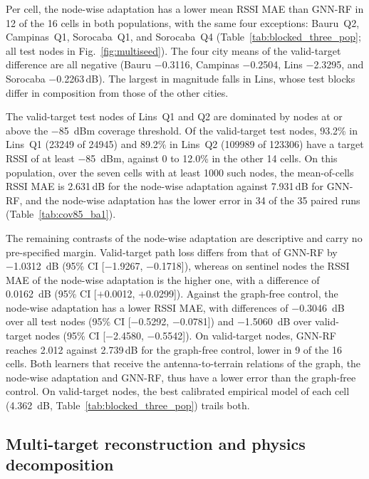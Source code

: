 \documentclass{ieeeaccess}
\begin{document}
Per cell, the node-wise adaptation has a lower mean RSSI MAE than GNN-RF in 12 of the 16 cells in both populations, with the same four exceptions: Bauru~Q2, Campinas~Q1, Sorocaba~Q1, and Sorocaba~Q4 (Table~\ref{tab:blocked_three_pop}; all test nodes in Fig.~\ref{fig:multiseed}). The four city means of the valid-target difference are all negative (Bauru $-$0.3116, Campinas $-$0.2504, Lins $-$2.3295, and Sorocaba $-$0.2263\,dB). The largest in magnitude falls in Lins, whose test blocks differ in composition from those of the other cities.

The valid-target test nodes of Lins~Q1 and Q2 are dominated by nodes at or above the $-$85~dBm coverage threshold. Of the valid-target test nodes, 93.2\% in Lins~Q1 (\num{23249} of \num{24945}) and 89.2\% in Lins~Q2 (\num{109989} of \num{123306}) have a target RSSI of at least $-$85~dBm, against 0 to 12.0\% in the other 14 cells. On this population, over the seven cells with at least \num{1000} such nodes, the mean-of-cells RSSI MAE is 2.631\,dB for the node-wise adaptation against 7.931\,dB for GNN-RF, and the node-wise adaptation has the lower error in 34 of the 35 paired runs (Table~\ref{tab:cov85_ba1}).



The remaining contrasts of the node-wise adaptation are descriptive and carry no pre-specified margin. Valid-target path loss differs from that of GNN-RF by \SI{-1.0312}{\deci\bel} (95\% CI [$-$1.9267, $-$0.1718]), whereas on sentinel nodes the RSSI MAE of the node-wise adaptation is the higher one, with a difference of \SI{+0.0162}{\deci\bel} (95\% CI [$+$0.0012, $+$0.0299]). Against the graph-free control, the node-wise adaptation has a lower RSSI MAE, with differences of \SI{-0.3046}{\deci\bel} over all test nodes (95\% CI [$-$0.5292, $-$0.0781]) and \SI{-1.5060}{\deci\bel} over valid-target nodes (95\% CI [$-$2.4580, $-$0.5542]). On valid-target nodes, GNN-RF reaches 2.012 against 2.739\,dB for the graph-free control, lower in 9 of the 16 cells. Both learners that receive the antenna-to-terrain relations of the graph, the node-wise adaptation and GNN-RF, thus have a lower error than the graph-free control. On valid-target nodes, the best calibrated empirical model of each cell (\SI{4.362}{\deci\bel}, Table~\ref{tab:blocked_three_pop}) trails both.

\subsection{Multi-target reconstruction and physics decomposition}
\label{sec:multitarget}
\end{document}
